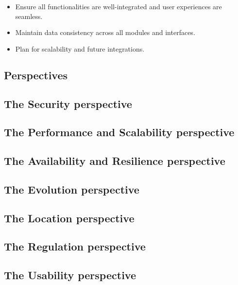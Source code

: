 \begin{itemize}
    \item Ensure all functionalities are well-integrated and user experiences are seamless.
    \item Maintain data consistency across all modules and interfaces.
    \item Plan for scalability and future integrations.
\end{itemize}


\subsection{Perspectives}


\subsection*{The Security perspective}


\subsection*{The Performance and Scalability perspective}


\subsection*{The Availability and Resilience perspective}


\subsection*{The Evolution perspective}


\subsection*{The Location perspective}


\subsection*{The Regulation perspective}


\subsection*{The Usability perspective}
